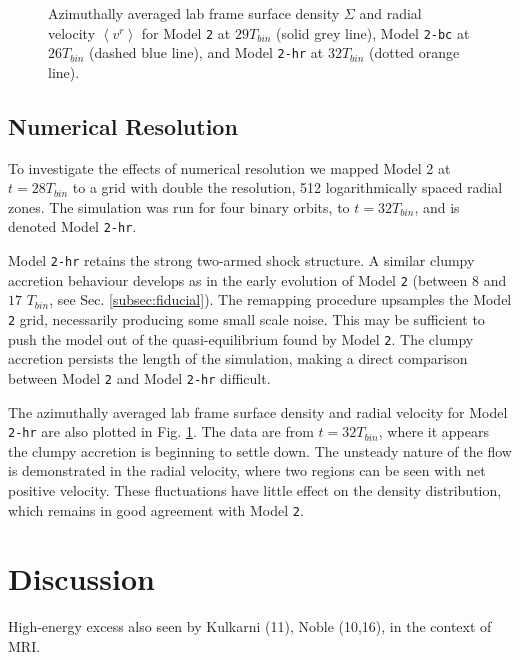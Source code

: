 \documentclass{emulateapj}
\newcommand{\model}[1]{{Model \texttt{#1}}}
\newcommand{\ave}[1]{\left \langle #1 \right \rangle}
\begin{document}
\begin{figure}
	\caption{\label{fi:q011_bc_hr_comp} Azimuthally averaged lab frame surface density $\Sigma$ and radial velocity $\ave{v^r}$ for \model{2} at $29T_{bin}$ (solid grey line), \model{2-bc} at $26T_{bin}$ (dashed blue line), and \model{2-hr}  at $32T_{bin}$ (dotted orange line).}
\end{figure}

\subsection{Numerical Resolution}
\label{subsec:res}

To investigate the effects of numerical resolution we mapped Model 2 at $t=28T_{bin}$ to a grid with double the resolution, 512 logarithmically spaced radial zones.  The simulation was run for four binary orbits, to $t = 32 T_{bin}$, and is denoted Model \texttt{2-hr}.

Model \texttt{2-hr} retains the strong two-armed shock structure. A similar clumpy accretion behaviour develops as in the early evolution of \model{2} (between $8$ and $17$ $T_{bin}$, see Sec. \ref{subsec:fiducial}).  The remapping procedure upsamples the \model{2} grid, necessarily producing some small scale noise.  This may be sufficient to push the model out of the quasi-equilibrium found by \model{2}. The clumpy accretion persists the length of the simulation, making a direct comparison between \model{2} and \model{2-hr} difficult.

The azimuthally averaged lab frame surface density and radial velocity for \model{2-hr} are also plotted in Fig. \ref{fi:q011_bc_hr_comp}.  The data are from $t = 32T_{bin}$, where it appears the clumpy accretion is beginning to settle down.  The unsteady nature of the flow is demonstrated in the radial velocity, where two regions can be seen with net positive velocity.  These fluctuations have little effect on the density distribution, which remains in good agreement with \model{2}.



\section{Discussion}
\label{sec:discussion}

High-energy excess also seen by Kulkarni (11), Noble (10,16), in the context of MRI.  

\end{document}
